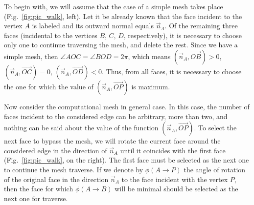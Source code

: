 \documentclass[
11pt,%
tightenlines,%
twoside,%
onecolumn,%
nofloats,%
nobibnotes,%
nofootinbib,%
superscriptaddress,%
noshowpacs,%
centertags]%
{revtex4-2}
\begin{document}
To begin with, we will assume that the case of a simple mesh takes place (Fig.~\ref{fig:pic_walk}, left).
Let it be already known that the face incident to the vertex $A$ is labeled and its outward normal equals $\vec{n}_A$.
Of the remaining three faces (incidental to the vertices $B$, $C$, $D$, respectively), it is necessary to choose only one to continue traversing the mesh, and delete the rest.
Since we have a simple mesh, then $\angle AOC = \angle BOD = 2 \pi$, which means $(\vec{n}_A, \vec{OB}) > 0$, $(\vec{n} _A, \vec{OC}) = 0$, $(\vec{n}_A, \vec{OD}) < 0$.
Thus, from all faces, it is necessary to choose the one for which the value of $(\vec{n}_A, \vec{OP})$ is maximum.

Now consider the computational mesh in general case.
In this case, the number of faces incident to the considered edge can be arbitrary, more than two, and nothing can be said about the value of the function $(\vec{n}_A, \vec{OP})$.
To select the next face to bypass the mesh, we will rotate the current face around the considered edge in the direction of $\vec{n}_A$ until it coincides with the first face (Fig.~\ref{fig:pic_walk}, on the right).
The first face must be selected as the next one to continue the mesh traverse.
If we denote by $\phi(A \rightarrow P)$ the angle of rotation of the original face in the direction $\vec{n}_A$ to the face incident with the vertex $P$, then the face for which $\phi(A \rightarrow B)$ will be minimal should be selected as the next one for traverse.
\end{document}
